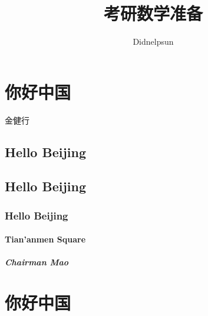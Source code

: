 \documentclass[UTF8]{ctexart}
\author{Didnelpsun}
\title{考研数学准备}
\begin{document}
\maketitle
\tableofcontents
\section{你好中国}
    金健行
\subsection{Hello Beijing}
\subsection{Hello Beijing}
\subsubsection{Hello Beijing}
\paragraph{Tian'anmen Square}
\subparagraph{Chairman Mao}
\section{你好中国}
\end{document}
